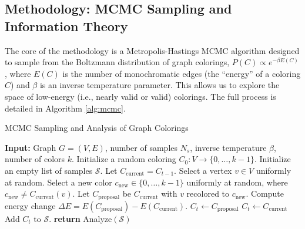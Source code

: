 \documentclass[12pt, letterpaper]{article}
\begin{document}
\subsection{Methodology: MCMC Sampling and Information Theory}
The core of the methodology is a Metropolis-Hastings MCMC algorithm designed to sample from the Boltzmann distribution of graph colorings, $P(C) \propto e^{-\beta E(C)}$, where $E(C)$ is the number of monochromatic edges (the ``energy'' of a coloring $C$) and $\beta$ is an inverse temperature parameter. This allows us to explore the space of low-energy (i.e., nearly valid or valid) colorings. The full process is detailed in Algorithm \ref{alg:mcmc}.

\begin{algorithm}
\caption{MCMC Sampling and Analysis of Graph Colorings}
\label{alg:mcmc}
\begin{algorithmic}[1]
\State \textbf{Input:} Graph $G=(V,E)$, number of samples $N_s$, inverse temperature $\beta$, number of colors $k$.
\State Initialize a random coloring $C_0: V \to \{0, \ldots, k-1\}$.
\State Initialize an empty list of samples $\mathcal{S}$.
    \State Let $C_{\text{current}} = C_{t-1}$.
    \State Select a vertex $v \in V$ uniformly at random.
    \State Select a new color $c_{\text{new}} \in \{0, \ldots, k-1\}$ uniformly at random, where $c_{\text{new}} \neq C_{\text{current}}(v)$.
    \State Let $C_{\text{proposal}}$ be $C_{\text{current}}$ with $v$ recolored to $c_{\text{new}}$.
    \State Compute energy change $\Delta E = E(C_{\text{proposal}}) - E(C_{\text{current}})$.
        \State $C_t \leftarrow C_{\text{proposal}}$ 
    \Else
        \State $C_t \leftarrow C_{\text{current}}$ 
    \EndIf
    \State Add $C_t$ to $\mathcal{S}$.
\EndFor
\State \textbf{return} Analyze$(\mathcal{S})$
\end{algorithmic}
\end{algorithm}
\end{document}
